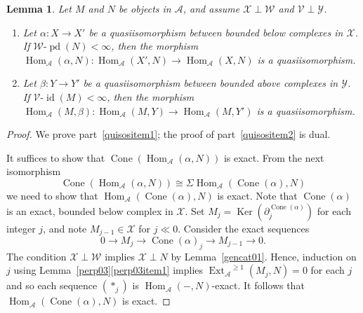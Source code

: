 \documentclass{amsart}
\newtheorem{lem}{Lemma}[section]
\begin{document}
\begin{lem} \label{quisos}
Let $M$ and $N$ be objects in ${{\mathcal{{A}}}}$, and assume ${{\mathcal{{X}}}}\perp{{\mathcal{{W}}}}$
and ${{\mathcal{{V}}}}\perp{{\mathcal{{Y}}}}$.
\begin{enumerate}[\quad\rm(a)]
\item \label{quisositem1}
Let  $\alpha\colon X\to X'$ be a quasiisomorphism between
bounded below complexes in ${{\mathcal{{X}}}}$.
If ${{{\mathcal{{{W}}}}\text{-}{\operatorname{pd}}}}(N)<\infty$,
then the morphism ${{\operatorname{Hom}}_{{\mathcal{{A}}}}}(\alpha,N)\colon{{\operatorname{Hom}}_{{\mathcal{{A}}}}}(X',N)\to{{\operatorname{Hom}}_{{\mathcal{{A}}}}}(X,N)$
is a quasiisomorphism.
\item \label{quisositem2}
Let  $\beta\colon Y\to Y'$ be a quasiisomorphism between
bounded above complexes in ${{\mathcal{{Y}}}}$.
If ${{{\mathcal{{{V}}}}\text{-}{\operatorname{id}}}}(M)<\infty$,
then the morphism ${{\operatorname{Hom}}_{{\mathcal{{A}}}}}(M,\beta)\colon{{\operatorname{Hom}}_{{\mathcal{{A}}}}}(M,Y)\to{{\operatorname{Hom}}_{{\mathcal{{A}}}}}(M,Y')$
is a quasiisomorphism.
\end{enumerate}
\end{lem}

\begin{proof}
We prove part~\eqref{quisositem1}; the proof of part~\eqref{quisositem2} is dual.

It suffices to show that  ${\operatorname{Cone}}({{\operatorname{Hom}}_{{\mathcal{{A}}}}}(\alpha,N))$ is exact.
From the next isomorphism 
$${\operatorname{Cone}}({{\operatorname{Hom}}_{{\mathcal{{A}}}}}(\alpha,N))\cong{\mathsf{\Sigma}}{{\operatorname{Hom}}_{{\mathcal{{A}}}}}({\operatorname{Cone}}(\alpha),N)$$
we need to show that ${{\operatorname{Hom}}_{{\mathcal{{A}}}}}({\operatorname{Cone}}(\alpha),N)$ is exact.  Note that
${\operatorname{Cone}}(\alpha)$ is an exact, bounded below complex in ${{\mathcal{{X}}}}$.  
Set  $M_j={\operatorname{Ker}}(\partial^{{\operatorname{Cone}}(\alpha)}_j)$ for each integer $j$, 
and note $M_{j-1}\in{{\mathcal{{X}}}}$ for $j \ll 0$.
Consider the exact sequences
\begin{equation} \label{exact01'} \tag{$\ast_j$}
0\to M_j\to {\operatorname{Cone}}(\alpha)_j\to M_{j-1}\to 0.
\end{equation}
The condition ${{\mathcal{{X}}}}\perp{{\mathcal{{W}}}}$ implies
${{\mathcal{{X}}}}\perp N$ by Lemma~\ref{gencat01}.
Hence, induction on $j$ using Lemma~\ref{perp03}\eqref{perp03item1} implies
${{\operatorname{Ext}}_{{\mathcal{{A}}}}}^{{\geqslant} 1}(M_j,N)=0$ for each $j$ and so each sequence $(\ast_j)$ is
${{\operatorname{Hom}}_{{\mathcal{{A}}}}}(-,N)$-exact.
It follows that ${{\operatorname{Hom}}_{{\mathcal{{A}}}}}({\operatorname{Cone}}(\alpha),N)$ is exact.
\end{proof}
\end{document}
